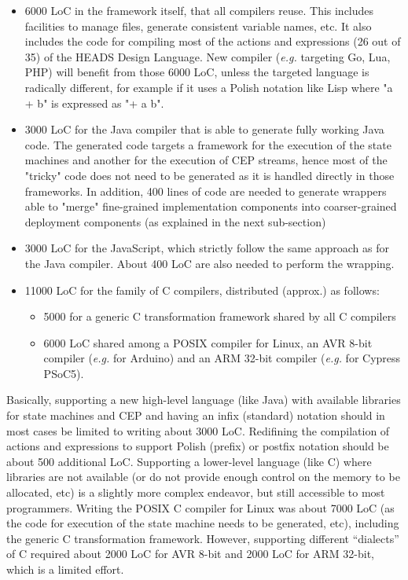 \begin{itemize}
\item 6000 LoC in the framework itself, that all compilers reuse. This includes facilities to manage files, generate consistent variable names, etc. It also includes the code for compiling most of the actions and expressions (26 out of 35) of the HEADS Design Language. New compiler ({\em e.g.} targeting Go, Lua, PHP) will benefit from those 6000 LoC, unless the targeted language is radically different, for example if it uses a Polish notation like Lisp where "a + b" is expressed as "+ a b". 
\item 3000 LoC for the Java compiler that is able to generate fully working Java code. The generated code targets a framework for the execution of the state machines and another for the execution of CEP streams, hence most of the "tricky" code does not need to be generated as it is handled directly in those frameworks. In addition, 400 lines of code are needed to generate wrappers able to "merge" fine-grained implementation components into coarser-grained deployment components (as explained in the next sub-section) 
\item 3000 LoC for the JavaScript, which strictly follow the same approach as for the Java compiler. About 400 LoC are also needed to perform the wrapping. 
\item 11000 LoC for the family of C compilers, distributed (approx.) as follows: 
\begin{itemize}

\item 5000 for a generic C transformation framework shared by all C compilers 
\item 6000 LoC shared among a POSIX compiler for Linux, an AVR 8-bit compiler ({\em e.g.} for Arduino) and an ARM 32-bit compiler ({\em e.g.} for Cypress PSoC5).
\end{itemize}
\end{itemize}

Basically, supporting a new high-level language (like Java) with available libraries for state machines and CEP and having an infix (standard) notation should in most cases be limited to writing about 3000 LoC. Redifining the compilation of actions and expressions to support Polish (prefix) or postfix notation should be about 500 additional LoC. 
Supporting a lower-level language (like C) where libraries are not available (or do not provide enough control on the memory to be allocated, etc) is a slightly more complex endeavor, but still accessible to most programmers. Writing the POSIX C compiler for Linux was about 7000 LoC (as the code for execution of the state machine needs to be generated, etc), including the generic C transformation framework. However, supporting different ``dialects'' of C required about 2000 LoC for AVR 8-bit and 2000 LoC for ARM 32-bit, which is a limited effort. 


